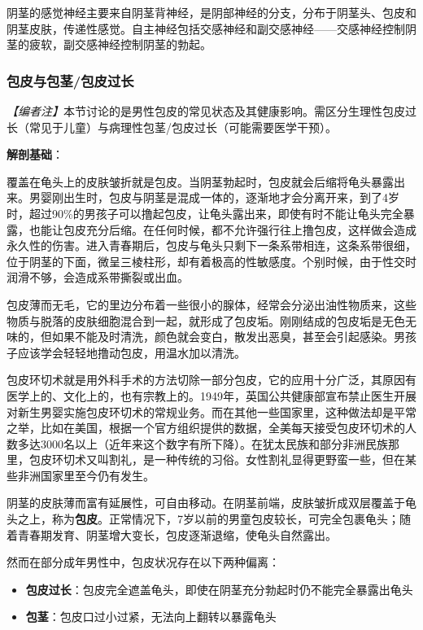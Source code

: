 阴茎的感觉神经主要来自阴茎背神经，是阴部神经的分支，分布于阴茎头、包皮和阴茎皮肤，传递性感觉。自主神经包括交感神经和副交感神经——交感神经控制阴茎的疲软，副交感神经控制阴茎的勃起。

\subsubsection{包皮与包茎/包皮过长}

\noindent\textit{【编者注】}本节讨论的是男性包皮的常见状态及其健康影响。需区分生理性包皮过长（常见于儿童）与病理性包茎/包皮过长（可能需要医学干预）。

\vspace{0.5em}
\noindent\textbf{解剖基础}：

覆盖在龟头上的皮肤皱折就是包皮。当阴茎勃起时，包皮就会后缩将龟头暴露出来。男婴刚出生时，包皮与阴茎是混成一体的，逐渐地才会分离开来，到了4岁时，超过90\%的男孩子可以撸起包皮，让龟头露出来，即使有时不能让龟头完全暴露，也能让包皮充分后缩。在任何时候，都不允许强行往上撸包皮，这样做会造成永久性的伤害。进入青春期后，包皮与龟头只剩下一条系带相连，这条系带很细，位于阴茎的下面，微呈三棱柱形，却有着极高的性敏感度。个别时候，由于性交时润滑不够，会造成系带撕裂或出血。

包皮薄而无毛，它的里边分布着一些很小的腺体，经常会分泌出油性物质来，这些物质与脱落的皮肤细胞混合到一起，就形成了包皮垢。刚刚结成的包皮垢是无色无味的，但如果不能及时清洗，颜色就会变白，散发出恶臭，甚至会引起感染。男孩子应该学会轻轻地撸动包皮，用温水加以清洗。

包皮环切术就是用外科手术的方法切除一部分包皮，它的应用十分广泛，其原因有医学上的、文化上的，也有宗教上的。1949年，英国公共健康部宣布禁止医生开展对新生男婴实施包皮环切术的常规业务。而在其他一些国家里，这种做法却是平常之举，比如在美国，根据一个官方组织提供的数据，全美每天接受包皮环切术的人数多达3000名以上（近年来这个数字有所下降）。在犹太民族和部分非洲民族那里，包皮环切术又叫割礼，是一种传统的习俗。女性割礼显得更野蛮一些，但在某些非洲国家里至今仍有发生。

阴茎的皮肤薄而富有延展性，可自由移动。在阴茎前端，皮肤皱折成双层覆盖于龟头之上，称为\textbf{包皮}。正常情况下，7岁以前的男童包皮较长，可完全包裹龟头；随着青春期发育、阴茎增大变长，包皮逐渐退缩，使龟头自然露出。

然而在部分成年男性中，包皮状况存在以下两种偏离：

\begin{itemize}
	\item \textbf{包皮过长}：包皮完全遮盖龟头，即使在阴茎充分勃起时仍不能完全暴露出龟头
	\item \textbf{包茎}：包皮口过小过紧，无法向上翻转以暴露龟头
\end{itemize}

